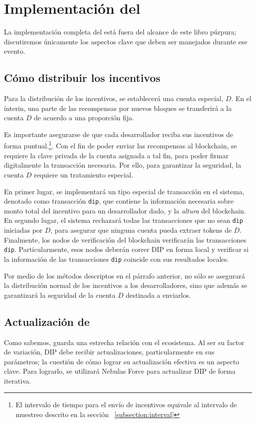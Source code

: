 \section{Implementación del \pidc}

\noindent
La implementación completa del \pidc está fuera del alcance de este libro púrpura; discutiremos únicamente los aspectos clave que deben ser manejados durante ese evento\@.

\subsection{Cómo distribuir los incentivos}
\noindent
Para la distribución de los incentivos, se establecerá una cuenta especial, $D$. En el ínterin, una parte de las recompensas por nuevos bloques se transferirá a la cuenta $D$ de acuerdo a una proporción fija.

Es importante asegurarse de que cada desarrollador reciba sus incentivos de forma puntual.\footnote{El intervalo de tiempo para el envío de incentivos equivale al intervalo de muestreo descrito en la sección ~\ref{subsection:interval}}. Con el fin de poder enviar las recompensas al blockchain, se requiere la clave privada de la cuenta asignada a tal fin, para poder firmar digitalmente la transacción necesaria. Por ello, para garantizar la seguridad, la cuenta $D$ requiere un tratamiento especial.

En primer lugar, se implementará un tipo especial de transacción en el sistema, denotado como transacción \texttt{dip}, que contiene la información necesaria sobre monto total del incentivo para un desarrollador dado, y la \textit{altura} del blockchain. En segundo lugar, el sistema rechazará todas las transacciones que no sean \texttt{dip} iniciadas por $D$, para asegurar que ninguna cuenta pueda extraer tokens de $D$. Finalmente, los nodos de verificación del blockchain verificarán las transacciones \texttt{dip}. Particularmente, esos nodos deberán correr DIP en forma local y verificar si la información de las transacciones \texttt{dip} coincide con sus resultados locales.

Por medio de los métodos descriptos en el párrafo anterior, no sólo se asegurará la distribución normal de los incentivos a los desarrolladores, sino que además se garantizará la seguridad de la cuenta $D$ destinada a enviarlos.

\subsection{Actualización de \pidc}
\noindent
Como sabemos, \pidc guarda una estrecha relación con el ecosistema. Al ser su factor de variación, DIP debe recibir actualizaciones, particularmente en sus parámetros; la cuestión de cómo lograr su actualización efectiva es un aspecto clave. Para lograrlo, se utilizará Nebulas Force para actualizar DIP de forma iterativa\@.

